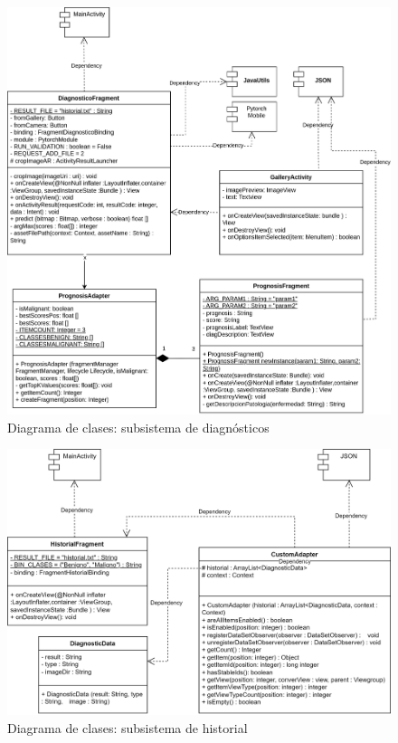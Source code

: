      \begin{figure}[H]
 	\centering
 	\includegraphics[scale = 0.75]{imagenes/androidAPP-Diagnostico.png}
 	\caption{Diagrama de clases: subsistema de diagnósticos}
 	\label{fig:clasesdiag}
 \end{figure}
 
      \begin{figure}[H]
 	\centering
 	\includegraphics[scale = 0.75]{imagenes/androidAPP-Historial.png}
 	\caption{Diagrama de clases: subsistema de historial}
 	\label{fig:claseshist}
 \end{figure}
 

